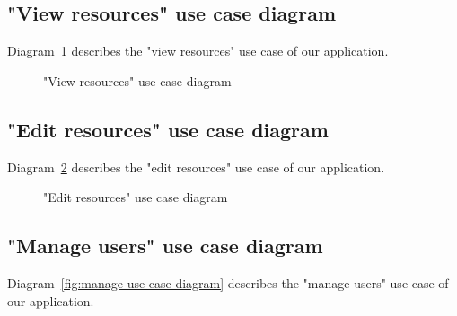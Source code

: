 \subsection{"View resources" use case diagram}
Diagram~\ref{fig:view-use-case-diagram} describes the "view resources" use case of our application.

\begin{figure}[H]
	\centerfloat

	\caption{"View resources" use case diagram}
	\label{fig:view-use-case-diagram}
\end{figure}

\subsection{"Edit resources" use case diagram}
Diagram~\ref{fig:edit-use-case-diagram} describes the "edit resources" use case of our application.

\begin{figure}[H]
	\centerfloat

	\caption{"Edit resources" use case diagram}
	\label{fig:edit-use-case-diagram}
\end{figure}

\subsection{"Manage users" use case diagram}
Diagram~\ref{fig:manage-use-case-diagram} describes the "manage users" use case of our application.

